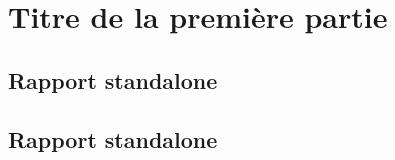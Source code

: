 \documentclass[a4paper,11pt]{report}
\begin{document}





%
%
\tableofcontents

\part{Titre de la première partie}
	\chapter{Rapport standalone}
	
	



	\chapter{Rapport standalone}
	
	



\newpage


\end{document}

